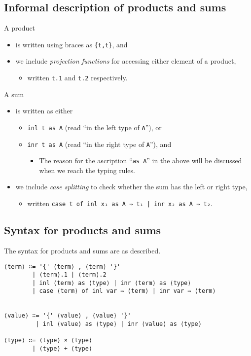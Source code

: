 \documentclass[11pt]{article}
\theoremstyle{definition}
\begin{document}
\subsection{Informal description of products and sums}
\label{sec:org2963185}

A product
\begin{itemize}
\item is written using braces as \texttt{\{t,t\}}, and
\item we include \emph{projection functions} for accessing either element of a product,
\begin{itemize}
\item written \texttt{t.1} and \texttt{t.2} respectively.
\end{itemize}
\end{itemize}

A sum
\begin{itemize}
\item is written as either
\begin{itemize}
\item \texttt{inl t as A} (read “in the left type of \texttt{A}”), or
\item \texttt{inr t as A} (read “in the right type of \texttt{A}”), and
\begin{itemize}
\item The reason for the ascription “\texttt{as A}” in the above will be discussed when
we reach the typing rules.
\end{itemize}
\end{itemize}
\item we include \emph{case splitting} to check whether the sum has the left or right type,
\begin{itemize}
\item written \texttt{case t of inl x₁ as A ⇒ t₁ | inr x₂ as A ⇒ t₂}.
\end{itemize}
\end{itemize}

\subsection{Syntax for products and sums}
\label{sec:orgf36ac38}

The syntax for products and sums are as described.
\begin{verbatim}
⟨term⟩ ∷= '{' ⟨term⟩ , ⟨term⟩ '}'
        | ⟨term⟩.1 | ⟨term⟩.2
        | inl ⟨term⟩ as ⟨type⟩ | inr ⟨term⟩ as ⟨type⟩
        | case ⟨term⟩ of inl var ⇒ ⟨term⟩ | inr var ⇒ ⟨term⟩
        
       
⟨value⟩ ∷= '{' ⟨value⟩ , ⟨value⟩ '}'
         | inl ⟨value⟩ as ⟨type⟩ | inr ⟨value⟩ as ⟨type⟩

⟨type⟩ ∷= ⟨type⟩ × ⟨type⟩
        | ⟨type⟩ + ⟨type⟩
\end{verbatim}
\end{document}
